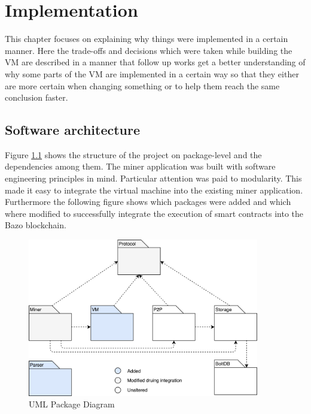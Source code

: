 \chapter{Implementation}
\thispagestyle{main} %
This chapter focuses on explaining why things were implemented in a certain manner. Here the trade-offs and decisions which were taken while building the VM are described in a manner that follow up works get a better understanding of why some parts of the VM are implemented in a certain way so that they either are more certain when changing something or to help them reach the same conclusion faster.

\section{Software architecture}
Figure \ref{package overview} shows the structure of the project on package-level and the dependencies among them. The miner application was built with software engineering principles in mind. Particular attention was paid to modularity. This made it easy to integrate the virtual machine into the existing miner application. Furthermore the following figure shows which packages were added and which where modified to successfully integrate the execution of smart contracts into the Bazo blockchain.
\begin{figure}[H]
	\begin{center}
	\includegraphics[width=0.9\textwidth]{./images/package-diagram}
	\caption{UML Package Diagram}
	\label{package overview}
	\end{center}
  \end{figure}
  
